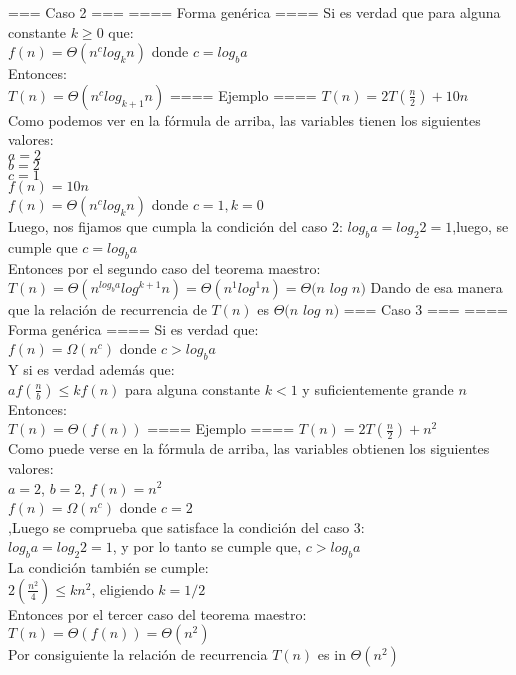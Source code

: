 \documentclass[12pt]{article}
\begin{document}
=== Caso 2 ===
==== Forma genérica ====
Si es verdad que para alguna constante $k\geq 0$ que:\\
$f(n)=\Theta(n^clog_k n)$ donde $c=log_b a$\\
Entonces:\\
$T(n)=\Theta(n^clog_{k+1} n)$
==== Ejemplo ====
$T(n)=2T(\frac{n}{2})+10n$\\
Como podemos ver en la fórmula de arriba, las variables tienen los siguientes valores:\\
$a=2$\\$b=2$\\$c=1$\\$f(n)=10n$\\
$f(n)=\Theta(n^clog_k n)$ donde $c=1,k=0$\\
Luego, nos fijamos que cumpla la condición del caso 2:
$log_b a=log_2 2=1$,luego, se cumple que $c=log_b a$\\
Entonces por el segundo caso del teorema maestro:\\
$T(n)=\Theta(n^{log_b a}log^{k+1}n)=\Theta(n^1log^1 n)=\Theta(n$ $log$ $n)$
Dando de esa manera que la relación de recurrencia de $T(n)$ es $\Theta(n$ $log$ $n)$
=== Caso 3 ===
==== Forma genérica ====
Si es verdad que:\\
$f(n)=\Omega(n^c)$ donde $c>log_ba$\\
Y si es verdad además que:\\
$af(\frac{n}{b})\leq kf(n)$ para alguna constante $k<1$ y suficientemente grande $n$\\
Entonces:\\
$T(n)=\Theta(f(n))$
==== Ejemplo ====
$T(n)=2T(\frac{n}{2})+n^2$\\
Como puede verse en la fórmula de arriba, las variables obtienen los siguientes valores:\\
$a=2$, $b=2$, $f(n)=n^2$\\
$f(n)=\Omega(n^c)$ donde $c=2$\\
,Luego se comprueba que satisface la condición del caso 3:\\
$log_ba=log_2 2=1$, y por lo tanto se cumple que, $c>log_ba$\\
La condición también se cumple:\\
$2$$(\frac{n^2}{4})$$\leq kn^2$, eligiendo $k=1/2$ \\
Entonces por el tercer caso del teorema maestro:\\
$T(n)=\Theta(f(n))=\Theta(n^2)$\\
Por consiguiente la relación de recurrencia $T(n)$ es in $\Theta(n^2)$
\end{document}
